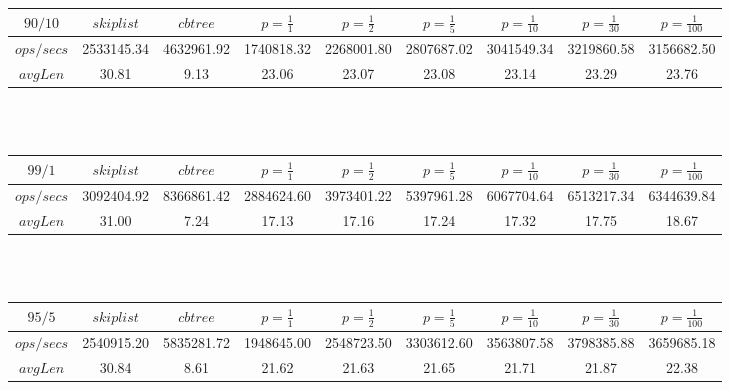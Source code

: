 \begin{tabular}{|c|c|c|c|c|c|c|c|c|}
$90/10$ & $skiplist$ & $cbtree$ & $p=\frac{1}{1}$ & $p=\frac{1}{2}$ & $p=\frac{1}{5}$ & $p=\frac{1}{10}$ & $p=\frac{1}{30}$ & $p=\frac{1}{100}$\\\hline
$ops/secs$ & 2533145.34 & 4632961.92 & 1740818.32 & 2268001.80 & 2807687.02 & 3041549.34 & 3219860.58 & 3156682.50\\\hline
$avgLen$ & 30.81 & 9.13 & 23.06 & 23.07 & 23.08 & 23.14 & 23.29 & 23.76\\\hline
\end{tabular}
\\\\
\begin{tabular}{|c|c|c|c|c|c|c|c|c|}
$99/1$ & $skiplist$ & $cbtree$ & $p=\frac{1}{1}$ & $p=\frac{1}{2}$ & $p=\frac{1}{5}$ & $p=\frac{1}{10}$ & $p=\frac{1}{30}$ & $p=\frac{1}{100}$\\\hline
$ops/secs$ & 3092404.92 & 8366861.42 & 2884624.60 & 3973401.22 & 5397961.28 & 6067704.64 & 6513217.34 & 6344639.84\\\hline
$avgLen$ & 31.00 & 7.24 & 17.13 & 17.16 & 17.24 & 17.32 & 17.75 & 18.67\\\hline
\end{tabular}
\\\\
\begin{tabular}{|c|c|c|c|c|c|c|c|c|}
$95/5$ & $skiplist$ & $cbtree$ & $p=\frac{1}{1}$ & $p=\frac{1}{2}$ & $p=\frac{1}{5}$ & $p=\frac{1}{10}$ & $p=\frac{1}{30}$ & $p=\frac{1}{100}$\\\hline
$ops/secs$ & 2540915.20 & 5835281.72 & 1948645.00 & 2548723.50 & 3303612.60 & 3563807.58 & 3798385.88 & 3659685.18\\\hline
$avgLen$ & 30.84 & 8.61 & 21.62 & 21.63 & 21.65 & 21.71 & 21.87 & 22.38\\\hline
\end{tabular}
\\\\
